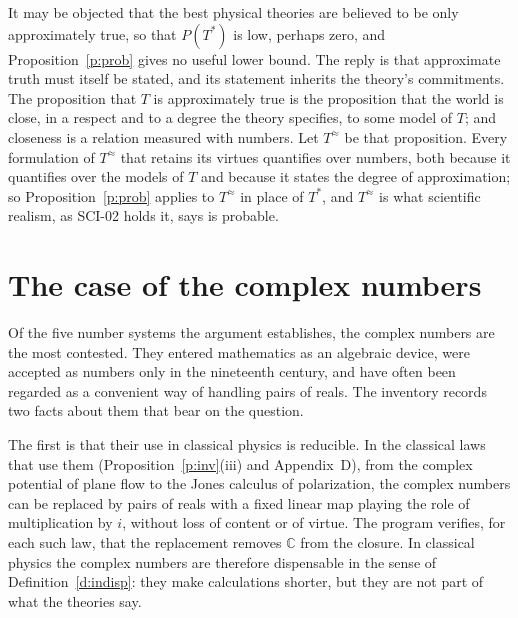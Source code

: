 \documentclass{situationist-preprint}
\begin{document}
It may be objected that the best physical theories are believed to be only approximately true, so that $P(T^*)$ is low, perhaps zero, and Proposition~\ref{p:prob} gives no useful lower bound. The reply is that approximate truth must itself be stated, and its statement inherits the theory's commitments. The proposition that $T$ is approximately true is the proposition that the world is close, in a respect and to a degree the theory specifies, to some model of $T$; and closeness is a relation measured with numbers. Let $T^{\approx}$ be that proposition. Every formulation of $T^{\approx}$ that retains its virtues quantifies over numbers, both because it quantifies over the models of $T$ and because it states the degree of approximation; so Proposition~\ref{p:prob} applies to $T^{\approx}$ in place of $T^*$, and $T^{\approx}$ is what scientific realism, as SCI-02 holds it, says is probable.

\section{The case of the complex numbers}\label{s:complex}

Of the five number systems the argument establishes, the complex numbers are the most contested. They entered mathematics as an algebraic device, were accepted as numbers only in the nineteenth century, and have often been regarded as a convenient way of handling pairs of reals. The inventory records two facts about them that bear on the question.

The first is that their use in classical physics is reducible. In the \nRed{} classical laws that use them (Proposition~\ref{p:inv}(iii) and Appendix~D), from the complex potential of plane flow to the Jones calculus of polarization, the complex numbers can be replaced by pairs of reals with a fixed linear map playing the role of multiplication by $i$, without loss of content or of virtue. The program verifies, for each such law, that the replacement removes $\mathbb C$ from the closure. In classical physics the complex numbers are therefore dispensable in the sense of Definition~\ref{d:indisp}: they make calculations shorter, but they are not part of what the theories say.
\end{document}
